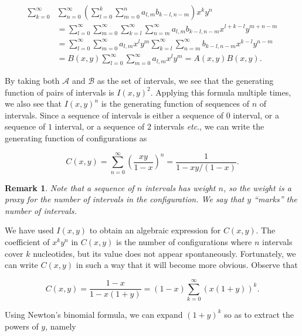 \documentclass{article}
\newtheorem*{remark}{Remark}
\begin{document}
\begin{equation*}
\begin{split}
\sum_{k=0}^\infty &\sum_{n=0}^\infty \left( \sum_{l=0}^k \sum_{m=0}^n
  a_{l,m}b_{k-l,n-m}\right) x^k y^n \\
&= \sum_{l=0}^\infty \sum_{m=0}^\infty \sum_{k=l}^\infty \sum_{n=m}^\infty
  a_{l,m}b_{k-l,n-m}x^{l + k-l} y^{m + n-m} \\ 
&= \sum_{l=0}^\infty \sum_{m=0}^\infty a_{l,m} x^l y^m
  \sum_{k=l}^\infty \sum_{n=m}^\infty
  b_{k-l,n-m}x^{k-l} y^{n-m} \\
&= B(x,y) \sum_{l=0}^\infty \sum_{m=0}^\infty a_{l,m} x^l y^m
 = A(x,y)B(x,y).
\end{split}
\end{equation*}

By taking both $\mathcal{A}$ and $\mathcal{B}$ as the set of intervals, we
see that the generating function of pairs of intervals is $I(x,y)^2$.
Applying this formula multiple times, we also see that $I(x,y)^n$ is the
generating function of sequences of $n$ of intervals. Since a sequence of
intervals is either a sequence of $0$ interval, or a sequence of $1$
interval, or a sequence of $2$ intervals \textit{etc}., we can write the
generating function of configurations as

\begin{equation*}
C(x,y) = \sum_{n=0}^\infty \left( \frac{xy}{1-x} \right)^n
= \frac{1}{1 - xy/(1-x)}.
\end{equation*}

\begin{remark}
Note that a sequence of $n$ intervals has weight $n$, so the weight is a
proxy for the number of intervals in the configuration.  We say that $y$
``marks'' the number of intervals.
\end{remark}

We have used $I(x,y)$ to obtain an algebraic expression for $C(x,y)$. The
coefficient of $x^ky^n$ in $C(x,y)$ is the number of configurations where
$n$ intervals cover $k$ nucleotides, but its value does not appear
spontaneously. Fortunately, we can write $C(x,y)$ in such a way that it
will become more obvious. Observe that

\begin{equation}
\label{eq:C}
C(x,y) = \frac{1-x}{1-x(1+y)} =
(1-x) \sum_{k=0}^\infty \left(x(1+y) \right)^k.
\end{equation}


Using Newton's binomial formula, we can expand $(1+y)^k$ so as to extract
the powers of $y$, namely
\end{document}
